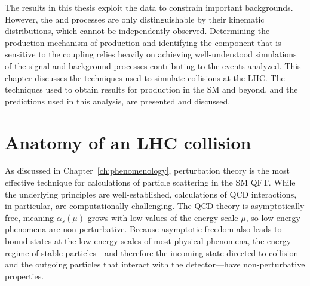 The results in this thesis exploit the data to constrain important backgrounds.
However, the \EWWZ and \QCDWZ processes are only distinguishable by their kinematic
distributions, which cannot be independently observed. 
Determining the production mechanism
of {\WZjj} production and identifying the component that is sensitive to the
\WWZZ coupling relies heavily on achieving well-understood simulations of the
signal and background processes contributing to the events analyzed.
This chapter discusses the techniques used to simulate \pp collisions at the
LHC. The techniques used to obtain results for \WZjj production in the SM and beyond,
and the predictions used in this analysis, are presented and discussed.

\section{Anatomy of an LHC collision}

As discussed in Chapter~\ref{ch:phenomenology}, perturbation theory is the 
most effective technique for calculations of particle scattering in
the SM QFT. While the underlying principles are well-established, calculations
of QCD interactions, in particular, are computationally challenging. The QCD 
theory is asymptotically free, meaning $\alpha_s(\mu)$ grows with low values of 
the energy scale $\mu$, so low-energy phenomena are non-perturbative.
Because asymptotic freedom also leads to bound states at the low 
energy scales of most physical phenomena, the energy regime of stable particles---and
therefore the incoming state directed to collision and the outgoing particles
that interact with the detector---have non-perturbative properties.

